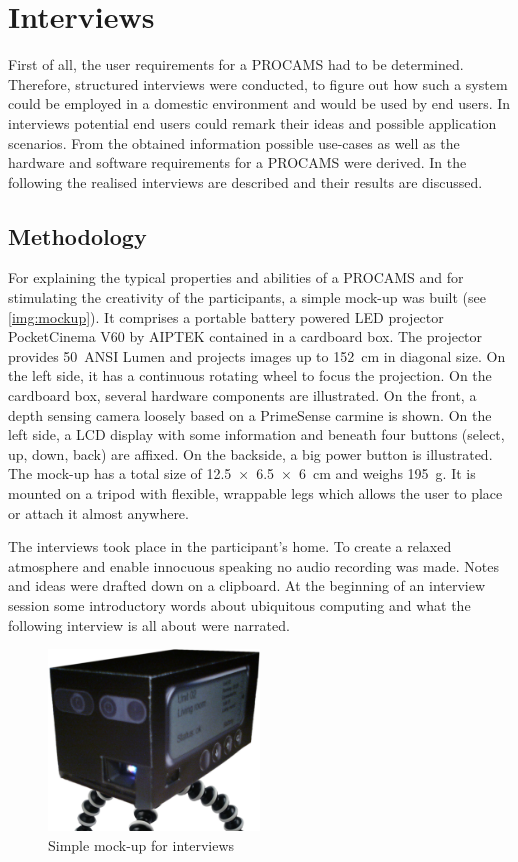 \chapter{Interviews}\label{chapter:interview}
First of all, the user requirements for a \acf{PROCAMS} had to be determined. Therefore, structured interviews were conducted, to figure out how such a system could be employed in a domestic environment and would be used by end users. In interviews potential end users could remark their ideas and possible application scenarios. From the obtained information possible use-cases as well as the hardware and software requirements for a PROCAMS were derived. In the following the realised interviews are described and their results are discussed.


\section{Methodology}
For explaining the typical properties and abilities of a PROCAMS and for stimulating the creativity of the participants, a simple mock-up was built (see \autoref{img:mockup}). It comprises a portable battery powered LED projector PocketCinema V60 by AIPTEK contained in a cardboard box. The projector provides \SI{50}{ANSI} Lumen and projects images up to \SI{152}{\cm} in diagonal size. On the left side, it has a continuous rotating wheel to focus the projection. On the cardboard box, several hardware components are illustrated. On the front, a depth sensing camera loosely based on a PrimeSense carmine is shown. On the left side, a LCD display with some information and beneath four buttons (select, up, down, back) are affixed. On the backside, a big power button is illustrated. The mock-up has a total size of \SI{12.5x6.5x6}{\cm} and weighs \SI{195}{\g}. It is mounted on a tripod with flexible, wrappable legs which allows the user to place or attach it almost anywhere.

The interviews took place in the participant's home. To create a relaxed atmosphere and enable innocuous speaking no audio recording was made. Notes and ideas were drafted down on a clipboard. At the beginning of an interview session some introductory words about ubiquitous computing and what the following interview is all about were narrated. 
\begin{figure}[htbp]
\begin{center}
\includegraphics[width=0.5\textwidth]{images/interview/mockup_nobg.png}
\caption{Simple mock-up for interviews}
\label{img:mockup}
\end{center}
\end{figure}


